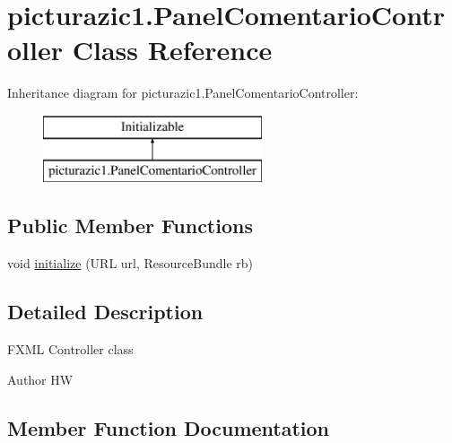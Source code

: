 \hypertarget{classpicturazic1_1_1_panel_comentario_controller}{}\section{picturazic1.\+Panel\+Comentario\+Controller Class Reference}
\label{classpicturazic1_1_1_panel_comentario_controller}
Inheritance diagram for picturazic1.\+Panel\+Comentario\+Controller\+:\begin{figure}[H]
\begin{center}
\leavevmode
\includegraphics[height=2.000000cm]{classpicturazic1_1_1_panel_comentario_controller}
\end{center}
\end{figure}
\subsection*{Public Member Functions}
\begin{DoxyCompactItemize}
\item 
void \mbox{\hyperlink{classpicturazic1_1_1_panel_comentario_controller_ac68b1c64d3e043f88b67b906230bb55e}{initialize}} (U\+RL url, Resource\+Bundle rb)
\end{DoxyCompactItemize}


\subsection{Detailed Description}
F\+X\+ML Controller class

\begin{DoxyAuthor}{Author}
HW 
\end{DoxyAuthor}


\subsection{Member Function Documentation}
\mbox{\label{classpicturazic1_1_1_panel_comentario_controller_ac68b1c64d3e043f88b67b906230bb55e}} 
